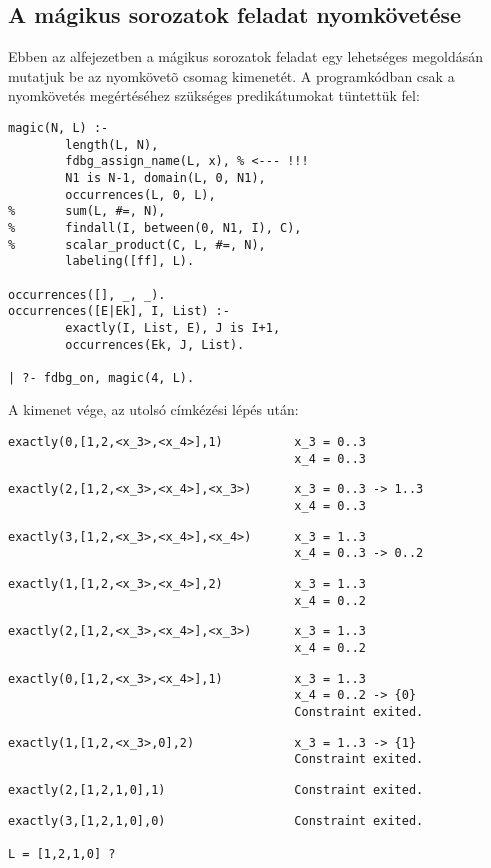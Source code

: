\subsection{A mágikus sorozatok feladat nyomkövetése}

Ebben az alfejezetben a mágikus sorozatok feladat egy lehetséges megoldásán
mutatjuk be az \fdbg nyomkövetõ csomag kimenetét. A programkódban csak a 
nyomkövetés megértéséhez szükséges predikátumokat tüntettük fel:

\begin{verbatim}
magic(N, L) :-
        length(L, N),
        fdbg_assign_name(L, x), % <--- !!!
        N1 is N-1, domain(L, 0, N1),
        occurrences(L, 0, L),
%       sum(L, #=, N),
%       findall(I, between(0, N1, I), C),
%       scalar_product(C, L, #=, N),
        labeling([ff], L).

occurrences([], _, _).
occurrences([E|Ek], I, List) :-
        exactly(I, List, E), J is I+1,
        occurrences(Ek, J, List).

| ?- fdbg_on, magic(4, L).
\end{verbatim}

A kimenet vége, az utolsó címkézési lépés után:

\begin{verbatim}
exactly(0,[1,2,<x_3>,<x_4>],1)          x_3 = 0..3
                                        x_4 = 0..3
\end{verbatim}
\begin{verbatim}
exactly(2,[1,2,<x_3>,<x_4>],<x_3>)      x_3 = 0..3 -> 1..3
                                        x_4 = 0..3        
\end{verbatim}
\begin{verbatim}
exactly(3,[1,2,<x_3>,<x_4>],<x_4>)      x_3 = 1..3        
                                        x_4 = 0..3 -> 0..2
\end{verbatim}
\begin{verbatim}
exactly(1,[1,2,<x_3>,<x_4>],2)          x_3 = 1..3
                                        x_4 = 0..2
\end{verbatim}
\begin{verbatim}
exactly(2,[1,2,<x_3>,<x_4>],<x_3>)      x_3 = 1..3
                                        x_4 = 0..2
\end{verbatim}
\begin{verbatim}
exactly(0,[1,2,<x_3>,<x_4>],1)          x_3 = 1..3        
                                        x_4 = 0..2 -> {0} 
                                        Constraint exited.
\end{verbatim}
\begin{verbatim}
exactly(1,[1,2,<x_3>,0],2)              x_3 = 1..3 -> {1} 
                                        Constraint exited.
\end{verbatim}
\begin{verbatim}
exactly(2,[1,2,1,0],1)                  Constraint exited.
\end{verbatim}
\begin{verbatim}
exactly(3,[1,2,1,0],0)                  Constraint exited.

L = [1,2,1,0] ? 
\end{verbatim}
